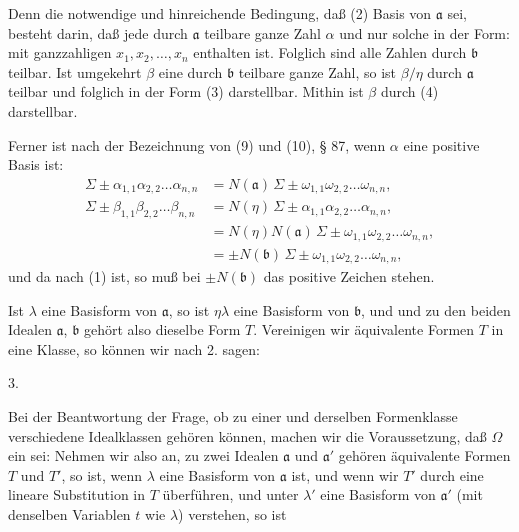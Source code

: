 Denn die notwendige und hinreichende Bedingung, daß (2) Basis von $\mathfrak{a}$ sei, besteht darin, daß jede durch $\mathfrak{a}$ teilbare ganze Zahl $\alpha$ und nur solche in der Form:
mit ganzzahligen $x_1, x_2, \ldots, x_n$ enthalten ist. Folglich sind alle Zahlen
durch $\mathfrak{b}$ teilbar. Ist umgekehrt $\beta$ eine durch $\mathfrak{b}$ teilbare ganze Zahl, so ist $\beta/\eta$ durch $\mathfrak{a}$ teilbar und folglich in der Form (3) darstellbar. Mithin ist $\beta$ durch (4) darstellbar.

Ferner ist nach der Bezeichnung von (9) und (10), § 87, wenn $\alpha$ eine positive Basis ist:
\[
\begin{aligned}
\Sigma \pm \alpha_{1,1}\alpha_{2,2}\ldots\alpha_{n,n} &= N(\mathfrak{a})\, \Sigma \pm \omega_{1,1}\omega_{2,2}\ldots\omega_{n,n}, \\
\Sigma \pm \beta_{1,1}\beta_{2,2}\ldots\beta_{n,n} &= N(\eta)\, \Sigma \pm \alpha_{1,1}\alpha_{2,2}\ldots\alpha_{n,n}, \\
&= N(\eta)N(\mathfrak{a})\, \Sigma \pm \omega_{1,1}\omega_{2,2}\ldots\omega_{n,n}, \\
&= \pm N(\mathfrak{b})\, \Sigma \pm \omega_{1,1}\omega_{2,2}\ldots\omega_{n,n},
\end{aligned}
\]
und da nach (1)
ist, so muß bei $\pm N(\mathfrak{b})$ das positive Zeichen stehen.

Ist $\lambda$ eine Basisform von $\mathfrak{a}$, so ist $\eta\lambda$ eine Basisform von $\mathfrak{b}$, und
und zu den beiden Idealen $\mathfrak{a}$, $\mathfrak{b}$ gehört also dieselbe Form $T$. Vereinigen wir äquivalente Formen $T$ in eine Klasse, so können wir nach 2. sagen:

3. 

Bei der Beantwortung der Frage, ob zu einer und derselben Formenklasse verschiedene Idealklassen gehören können, machen wir die Voraussetzung, daß $\Omega$ ein  sei: Nehmen wir also an, zu zwei Idealen $\mathfrak{a}$ und $\mathfrak{a}'$ gehören äquivalente Formen $T$ und $T'$, so ist, wenn $\lambda$ eine Basisform von $\mathfrak{a}$ ist,
und wenn wir $T'$ durch eine lineare Substitution in $T$ überführen, und unter $\lambda'$ eine Basisform von $\mathfrak{a}'$ (mit denselben Variablen $t$ wie $\lambda$) verstehen, so ist
